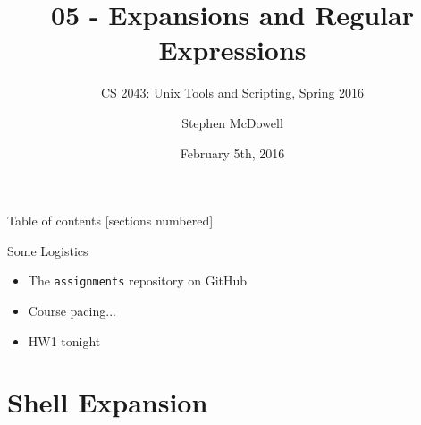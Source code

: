 %
%
%
%


%
%
\title{05 \-- Expansions and Regular Expressions}
\subtitle{CS 2043: Unix Tools and Scripting, Spring 2016 \cite{prevSemesters}}
\date{February 5th, 2016}
\author{Stephen McDowell}


\maketitle

\begin{frame}{Table of contents}
  [sections numbered]
  \tableofcontents[hideallsubsections]
\end{frame}

\begin{frame}{Some Logistics}
  \begin{itemize}[<+- | alert@+>]
    \item The \texttt{assignments} repository on GitHub
    \item Course pacing...
    \item HW1 tonight
  \end{itemize}
\end{frame}

%
\section{Shell Expansion}
\label{sec:shell_expansion}


